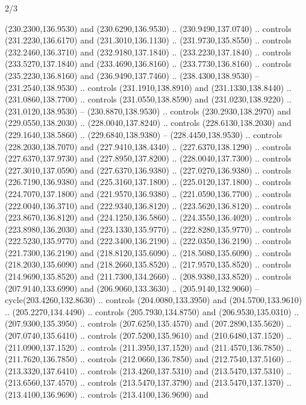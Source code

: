 \begin{flagdescription}{2/3}
\begin{scope}[xshift=0.5\flaglength,yshift=0.5\flagwidth,scale=\flagwidth/259.2]
\begin{scope}[y=0.8pt, x=0.8pt, yscale=-1,shift={(-243,-162)}]
      (230.2300,136.9530) and (230.6290,136.9530) .. (230.9490,137.0740) .. controls
      (231.2230,136.6170) and (231.3010,136.1130) .. (231.9730,135.8550) .. controls
      (232.2460,136.3710) and (232.9180,137.1840) .. (233.2230,137.1840) .. controls
      (233.5270,137.1840) and (233.4690,136.8160) .. (233.7730,136.8160) .. controls
      (235.2230,136.8160) and (236.9490,137.7460) .. (238.4300,138.9530) --
      (231.2540,138.9530) .. controls (231.1910,138.8910) and (231.1330,138.8440) ..
      (231.0860,138.7700) .. controls (231.0550,138.8590) and (231.0230,138.9220) ..
      (231.0120,138.9530) -- (230.8870,138.9530) .. controls (230.2930,138.2970) and
      (229.0550,138.2030) .. (228.0040,137.8240) .. controls (228.6130,138.2030) and
      (229.1640,138.5860) .. (229.6840,138.9380) -- (228.4450,138.9530) .. controls
      (228.2030,138.7070) and (227.9410,138.4340) .. (227.6370,138.1290) .. controls
      (227.6370,137.9730) and (227.8950,137.8200) .. (228.0040,137.7300) .. controls
      (227.3010,137.0590) and (227.6370,136.9380) .. (227.0270,136.9380) .. controls
      (226.7190,136.9380) and (225.3160,137.1800) .. (225.0120,137.1800) .. controls
      (224.7070,137.1800) and (221.9570,136.9380) .. (221.0590,136.7700) .. controls
      (222.0040,136.3710) and (222.9340,136.8120) .. (223.5620,136.8120) .. controls
      (223.8670,136.8120) and (224.1250,136.5860) .. (224.3550,136.4020) .. controls
      (223.8980,136.2030) and (223.1330,135.9770) .. (222.8280,135.9770) .. controls
      (222.5230,135.9770) and (222.3400,136.2190) .. (222.0350,136.2190) .. controls
      (221.7300,136.2190) and (218.8120,135.6090) .. (218.5080,135.6090) .. controls
      (218.2030,135.6090) and (218.2660,135.8520) .. (217.9570,135.8520) .. controls
      (214.9690,135.8520) and (211.7300,134.2660) .. (208.9380,133.8520) .. controls
      (207.9140,133.6990) and (206.9060,133.3630) .. (205.9140,132.9060) --
      cycle(203.4260,132.8630) .. controls (204.0080,133.3950) and
      (204.5700,133.9610) .. (205.2270,134.4490) .. controls (205.7930,134.8750) and
      (206.9530,135.0310) .. (207.9300,135.3950) .. controls (207.6250,135.4570) and
      (207.2890,135.5620) .. (207.0740,135.6410) .. controls (207.5200,135.9610) and
      (210.6480,137.1520) .. (211.0900,137.1520) .. controls (211.3950,137.1520) and
      (211.4570,136.7850) .. (211.7620,136.7850) .. controls (212.0660,136.7850) and
      (212.7540,137.5160) .. (213.3320,137.6410) .. controls (213.4260,137.5310) and
      (213.5470,137.5310) .. (213.6560,137.4570) .. controls (213.5470,137.3790) and
      (213.5470,137.1370) .. (213.4100,136.9690) .. controls (213.4100,136.9690) and

\end{scope}
\end{scope}
\end{flagdescription}
